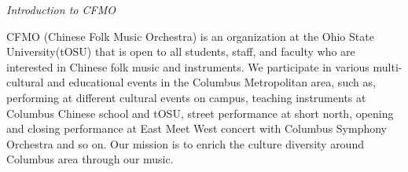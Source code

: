\documentclass[letter,8pt,poets]{ConcProg}
\begin{document}
\begin{spacing}{1.0}
\begin{multicols}{2}
\end{multicols}
\begin{center}
\Large\textsl{ Introduction to CFMO}
\end{center}

CFMO (Chinese Folk Music Orchestra) is an organization at the Ohio State University(tOSU) that is open to all students, staff, and faculty who are interested in Chinese folk music and instruments. We participate in various multi-cultural and educational events in the Columbus Metropolitan area, such as, performing at different cultural events on campus, teaching instruments at Columbus Chinese school and tOSU, street performance at short north, opening and closing performance at East Meet West concert with Columbus Symphony Orchestra and so on. Our mission is to enrich the culture diversity around Columbus area through our music.
\end{spacing}
\end{document}
